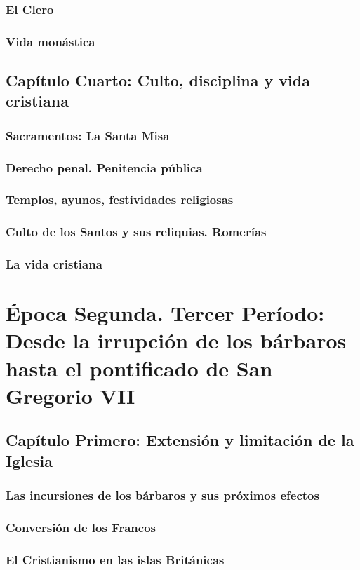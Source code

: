 \raggedbottom{} \documentclass[12pt, a4paper]{book}
\begin{document}
\section{El Clero}
\section{Vida monástica}
\chapter{Capítulo Cuarto: Culto, disciplina y vida cristiana}
\section{Sacramentos: La Santa Misa}
\section{Derecho penal. Penitencia pública}
\section{Templos, ayunos, festividades religiosas}
\section{Culto de los Santos y sus reliquias. Romerías}
\section{La vida cristiana}
\part{Época Segunda. Tercer Período: Desde la irrupción de los bárbaros hasta el pontificado de San Gregorio VII}
\chapter{Capítulo Primero: Extensión y limitación de la Iglesia}
\section{Las incursiones de los bárbaros y sus próximos efectos}
\section{Conversión de los Francos}
\section{El Cristianismo en las islas Británicas}
\end{document}

